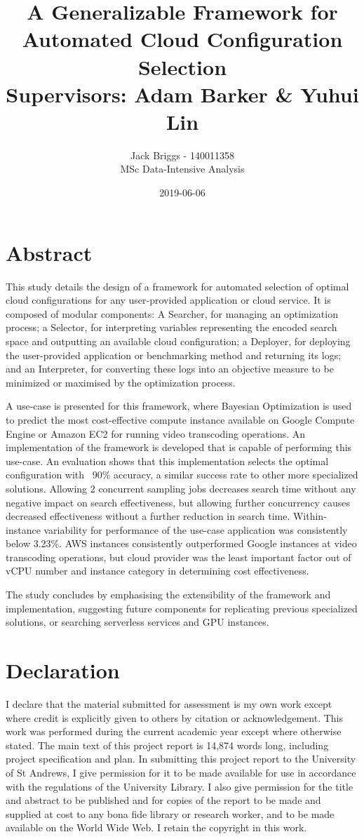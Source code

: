 \documentclass{report}
\title{\vspace{-2.0cm} A Generalizable Framework for Automated Cloud Configuration Selection \\ \vspace{0.5cm} \large Supervisors: Adam Barker \& Yuhui Lin}
\date{2019-06-06}
\author{Jack Briggs - 140011358 \\ MSc Data-Intensive Analysis}
\begin{document}
\maketitle
\newpage
\chapter*{Abstract}
This study details the design of a framework for automated selection of optimal cloud configurations for any user-provided application or cloud service. It is composed of modular components: A Searcher, for managing an optimization process; a Selector, for interpreting variables representing the encoded search space and outputting an available cloud configuration; a Deployer, for deploying the user-provided application or benchmarking method and returning its logs; and an Interpreter, for converting these logs into an objective measure to be minimized or maximised by the optimization process. 

A use-case is presented for this framework, where Bayesian Optimization is used to predict the most cost-effective compute instance available on Google Compute Engine or Amazon EC2 for running video transcoding operations. An implementation of the framework is developed that is capable of performing this use-case. An evaluation shows that this implementation selects the optimal configuration with ~90\% accuracy, a similar success rate to other more specialized solutions. Allowing 2 concurrent sampling jobs decreases search time without any negative impact on search effectiveness, but allowing further concurrency causes decreased effectiveness without a further reduction in search time. Within-instance variability for performance of the use-case application was consistently below 3.23\%. AWS instances consistently outperformed Google instances at video transcoding operations, but cloud provider was the least important factor out of vCPU number and instance category in determining cost effectiveness.

The study concludes by emphasising the extensibility of the framework and implementation, suggesting future components for replicating previous specialized solutions, or searching serverless services and GPU instances.
\newpage
\chapter*{Declaration}
I declare that the material submitted for assessment
is my own work except where credit is explicitly
given to others by citation or acknowledgement. This
work was performed during the current academic year
except where otherwise stated.
The main text of this project report is 14,874 words
long, including project specification and plan.
In submitting this project report to the University of St
Andrews, I give permission for it to be made
available for use in accordance with the regulations of the University Library. I also give permission for the title and abstract to be published and for copies of the report to be made and supplied at cost to any bona fide library or research worker, and to be made available on the World Wide Web. I retain the copyright in this work.
\newpage
\tableofcontents
\listoffigures
\newpage
{}
\end{document}
